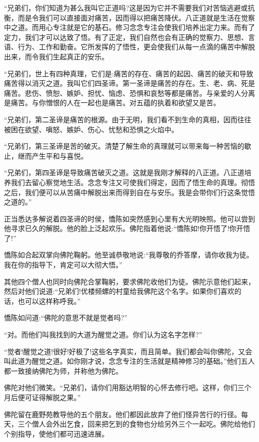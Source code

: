 \documentclass[12pt,twoside,openany]{book}
\begin{document}
“兄弟们，你们知道为甚么我叫它正道吗?这是因为它并不需要我们对苦恼逃避或抗衡，而是令我们可以直接面对痛苦，因而得以把痛苦降伏。八正道就是生活在觉察中之道。而用心专注就是它的基石。修习念念专注会使我们培养出定力来。而有了定力，我们才可以达致了悟。有了正定，我们自然也会有正确的觉察力、思想、言语、行为、工作和勤奋。它所发挥的了悟性，更会使我们从每一点滴的痛苦中解脱出来，而令我们生起真正的安乐。

“兄弟们，世上有四种真理，它们是:痛苦的存在、痛苦的起因、痛苦的破灭和导致痛苦得以消灭之道。我叫它们四圣谛。第一圣谛是痛苦的存在。生、老、病、死是痛苦。悲伤、愤恕、嫉妒、担忧、恼虑、恐惧和哀愁等都是痛苦。与亲爱的人分离是痛苦。与你憎恨的人在一起也是痛苦。对五蕴的执着和欲望又是苦。

“兄弟们，第二圣谛是痛苦的根源。由于无明，我们看不到生命的真相，因而往往被困在欲望、嗔怒、嫉妒、伤心、忧愁和恐惧之火焰中。

“兄弟们，第三圣谛是苦的破灭。清楚了解生命的真理就可以带来每一种苦恼的歇止，继而产生平和与喜悦。

“兄弟们，第四圣谛是导致痛苦破灭之道。这就是我刚才解释的八正道。八正道培养我们去留心察觉地生活。念念专注又可使我们得定，因而了悟生命的真理。彻悟之后，我们便可以从苦痛中解脱出来而得到自在与安乐。我是会带你们行这条觉悟之道的。”

正当悉达多解说着四圣谛的时侯，憍陈如突然感到心里有大光明映照。他可以尝到他寻求已久的解脱。他的脸上泛起欢乐。佛陀指着他说:“憍陈如!你开悟了!你开悟了!”

憍陈如合起双掌向佛陀鞠躬。他至诚恭敬地说:“我尊敬的乔答摩，请你收我为徒。我在你的指导下，肯定可以大彻大悟。”

其他四个僧人也同时向佛陀合掌鞠躬，要求佛陀收他们为徒。佛陀示意他们起来，然后对他们说道:“兄弟们!优楼频螺的村童给我佛陀这个名字。如果你们喜欢的话，也可以这样称呼我。”

憍陈如问道:“佛陀的意思不就是觉者吗?”

“对。而他们叫我找到的大道为醒觉之道。你们认为这名字怎样?”

“觉者!醒觉之道!很好!好极了!这些名字真实，而且简单。我们都会叫你佛陀，又会叫此道为醒觉之道。如你刚才说，念念专注的生活就是精神修习的基础。”他们五人都一致接纳佛陀为师，并称他为佛陀。

佛陀对他们微笑。“兄弟们，请你们用豁达明智的心怀去修行吧。这样，你们三个月后便可证得解脱之果。”

佛陀留在鹿野苑教导他的五个朋友。他们都因此放弃了他们怪异苦行的行径。每天，三个僧人会外出乞食，回来把乞到的食物也分给另外三个一起吃。佛陀给他们个别指导，使他们都可迅速进展。
\end{document}
